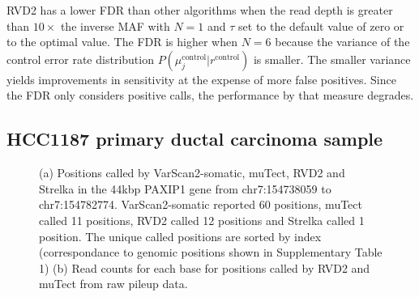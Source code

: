 \documentclass{bioinfo}
\begin{document}
RVD2 has a lower FDR than other algorithms when the read depth is greater than $10\times$ the inverse MAF with $N=1$ and $\tau$ set to the default value of zero or to the optimal value. The FDR is higher when $N=6$ because the variance of the control error rate distribution $P(\mu_j^{\text{control}} | r^{\text{control}})$ is smaller. The smaller variance yields improvements in sensitivity at the expense of more false positives. Since the FDR only considers positive calls, the performance by that measure degrades.

\subsection{HCC1187 primary ductal carcinoma sample}\label{sec:brca}

\begin{figure}[!pthb]
    \centering
    \caption{(a) Positions called by VarScan2-somatic, muTect, RVD2 and Strelka in the 44kbp PAXIP1 gene from chr7:154738059 to chr7:154782774. VarScan2-somatic reported 60 positions, muTect called 11 positions, RVD2 called 12 positions and Strelka called 1 position. The unique called positions are sorted by index (correspondance to genomic positions shown in Supplementary Table 1) (b) Read counts for each base for positions called by RVD2 and muTect from raw pileup data.}%
    \label{fig:brca_dot}%
\end{figure}
\end{document}

